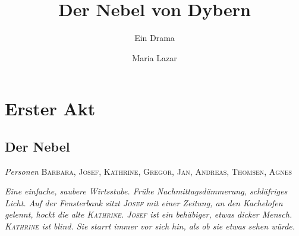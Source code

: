 \documentclass[
	final,
	a4paper,
	ngerman,
	mpinclude = true, %
	twoside = true,
	open = right,
	cleardoublepage = plain,
	DIV = 13,
	BCOR = 1cm,
	titlepage = firstiscover,
	]{scrbook}
\title{Der Nebel von Dybern}
\subtitle{Ein Drama}
\author{Maria Lazar}
\date{\ifdirectorsversion{-- Regie-Version --}{}}
\newcommand{\act}{\chapter}
\newcommand{\scene}{\setcounter{subscene}{1}\section}
\newcommand{\setting}[1]{\vspace{-0.5\baselineskip}\centering\textit{#1}}
\newcounter{subscene}
\newcommand{\characterlist}[1]{{\begin{center}\textit{Personen} #1\end{center}}}
\newcommand{\thecharacter}[1]{\textup{\textsc{#1}}\xspace}
\newcommand{\theBarbara}{\thecharacter{Barbara}}
\newcommand{\theJosef}{\thecharacter{Josef}}
\newcommand{\theKathrine}{\thecharacter{Kathrine}}
\newcommand{\theGregor}{\thecharacter{Gregor}}
\newcommand{\theJan}{\thecharacter{Jan}}
\newcommand{\theAndreas}{\thecharacter{Andreas}}
\newcommand{\theAgnes}{\thecharacter{Agnes}}
\newcommand{\theThomsen}{\thecharacter{Thomsen}}
\begin{document}
%
\cleardoubleoddemptypage

\maketitle

\tableofcontents
\cleardoubleoddpage

\pagestyle{headings}
\doublespacing

\act{Erster Akt}
\scene{Der Nebel}
\characterlist{\theBarbara, \theJosef, \theKathrine, \theGregor, \theJan, \theAndreas, \theThomsen, \theAgnes}
\setting{Eine einfache, saubere Wirtsstube. Frühe Nachmittagsdämmerung, schläfriges Licht. Auf der Fensterbank sitzt \theJosef mit einer Zeitung, an den Kachelofen gelennt, hockt die alte \theKathrine. \theJosef ist ein behäbiger, etwas dicker Mensch. \theKathrine ist blind. Sie starrt immer vor sich hin, als ob sie etwas sehen würde.}
\end{document}
